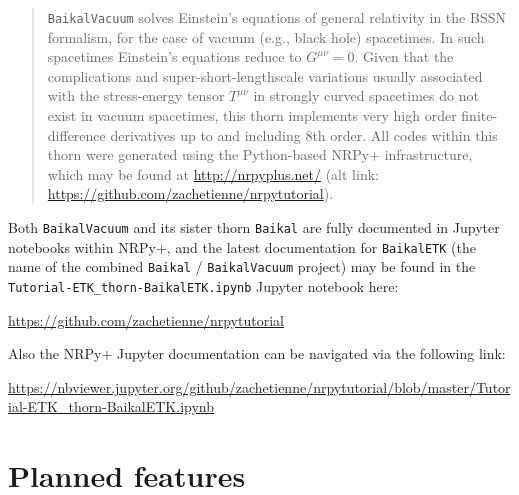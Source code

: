\newenvironment{packed_enumerate}{
\begin{enumerate}
  \setlength{\itemsep}{0.0pt}
  \setlength{\parskip}{0.0pt}
  \setlength{\parsep}{ 0.0pt}
}{\end{enumerate}}

\begin{abstract}
\texttt{BaikalVacuum} solves Einstein's equations of general
relativity in the BSSN formalism, for the case of vacuum (e.g., black
hole) spacetimes. In such spacetimes Einstein's equations reduce to
$G^{\mu \nu}=0$. Given that the complications and
super-short-lengthscale variations usually associated with the
stress-energy tensor $T^{\mu\nu}$ in strongly curved spacetimes do not
exist in vacuum spacetimes, this thorn implements very high order
finite-difference derivatives up to and including 8th order. All codes
within this thorn were generated using the Python-based NRPy+
infrastructure, which may be found at \url{http://nrpyplus.net/} (alt
link: \url{https://github.com/zachetienne/nrpytutorial}).
\end{abstract}

Both \texttt{BaikalVacuum} and its sister thorn \texttt{Baikal} are
fully documented in Jupyter notebooks within NRPy+, and
the latest documentation for \texttt{BaikalETK} (the name of the
combined \texttt{Baikal} / \texttt{BaikalVacuum} project) may be found
in the \texttt{Tutorial-ETK\_thorn-BaikalETK.ipynb} Jupyter notebook here:

\url{https://github.com/zachetienne/nrpytutorial}

Also the NRPy+ Jupyter documentation can be navigated via the
following link:

\url{https://nbviewer.jupyter.org/github/zachetienne/nrpytutorial/blob/master/Tutorial-ETK_thorn-BaikalETK.ipynb}

\section{Planned features}

